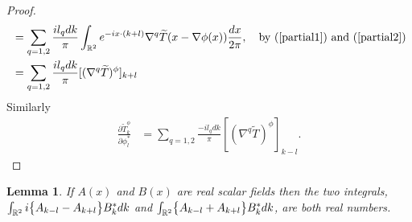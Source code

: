 \documentclass[noinfoline]{imsart}
\newtheorem{lemma}{Lemma}
\begin{document}
\begin{proof}
\begin{align}
\nonumber &= \sum_{q=1,2}\frac{ il_q  dk}{\pi}  \int_{\Bbb R^2} e^{- ix \cdot (k+l)} \nabla^q\widetilde T(x-\nabla \phi(x))\frac{dx}{2\pi},\quad\text{by (\ref{partial1}) and (\ref{partial2})} \\
&=\sum_{q=1,2}\frac{  il_q dk}{\pi} [(\nabla^q\widetilde T)^\phi]_{k+l}
\end{align}
Similarly 
\begin{align}
\frac{\partial \widetilde T^\phi_k }{\partial \phi^*_l } 
 &=\sum_{q=1,2}\frac{ -il_q dk}{\pi} [(\nabla^q\widetilde T)^\phi]_{k-l}.
\end{align}
\end{proof}





\begin{lemma} 
\label{forreal}
If $A(x)$ and $B(x)$ are real scalar fields then  the two  integrals,  $\int_{\Bbb R^2} i\bigl\{ A_{k-l}  -   A_{k+l}  \bigr\} B^*_k dk$ and  $\int_{\Bbb R^2}\bigl\{  A_{k-l}  +    A_{k+l}   \bigr\} B^*_k dk$, are both real numbers.
\end{lemma}
\end{document}
